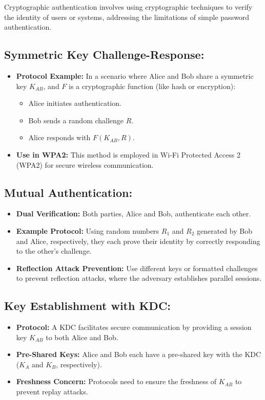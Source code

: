 \documentclass[12pt]{article}
\begin{document}
Cryptographic authentication involves using cryptographic techniques to verify the identity of users or systems, addressing the limitations of simple password authentication.

\subsection*{Symmetric Key Challenge-Response:}
\begin{itemize}
    \item \textbf{Protocol Example:} In a scenario where Alice and Bob share a symmetric key \( K_{AB} \), and \( F \) is a cryptographic function (like hash or encryption):
    \begin{itemize}
        \item Alice initiates authentication.
        \item Bob sends a random challenge \( R \).
        \item Alice responds with \( F(K_{AB}, R) \).
    \end{itemize}
    \item \textbf{Use in WPA2:} This method is employed in Wi-Fi Protected Access 2 (WPA2) for secure wireless communication.
\end{itemize}

\subsection*{Mutual Authentication:}
\begin{itemize}
    \item \textbf{Dual Verification:} Both parties, Alice and Bob, authenticate each other.
    \item \textbf{Example Protocol:} Using random numbers \( R_1 \) and \( R_2 \) generated by Bob and Alice, respectively, they each prove their identity by correctly responding to the other's challenge.
    \item \textbf{Reflection Attack Prevention:} Use different keys or formatted challenges to prevent reflection attacks, where the adversary establishes parallel sessions.
\end{itemize}

\subsection*{Key Establishment with KDC:}
\begin{itemize}
    \item \textbf{Protocol:} A KDC facilitates secure communication by providing a session key \( K_{AB} \) to both Alice and Bob.
    \item \textbf{Pre-Shared Keys:} Alice and Bob each have a pre-shared key with the KDC (\( K_A \) and \( K_B \), respectively).
    \item \textbf{Freshness Concern:} Protocols need to ensure the freshness of \( K_{AB} \) to prevent replay attacks.
\end{itemize}
\end{document}
